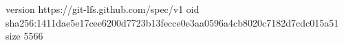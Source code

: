version https://git-lfs.github.com/spec/v1
oid sha256:1411dae5e17cee6200d7723b13fecce0e3aa0596a4cb8020c7182d7cdc015a51
size 5566
